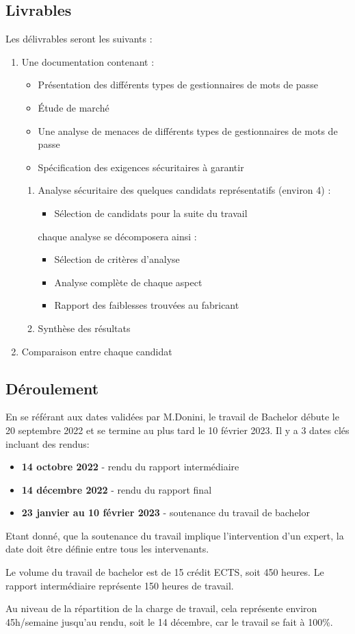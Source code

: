 \subsection*{Livrables}
Les délivrables seront les suivants :
\begin{enumerate}
\item Une documentation contenant :
	\begin{itemize}
	\item Présentation des différents types de gestionnaires de mots de passe
	\item Étude de marché
	\item Une analyse de menaces de différents types de gestionnaires de mots de passe
	\item Spécification des exigences sécuritaires à garantir
	\end{itemize}
	\begin{enumerate}
	\item Analyse sécuritaire des quelques candidats représentatifs (environ 4) :
		\begin{itemize}
		\item Sélection de candidats pour la suite du travail
		\end{itemize}
	chaque analyse se décomposera ainsi :
		\begin{itemize}
			\item Sélection de critères d'analyse
			\item Analyse complète de chaque aspect
			\item Rapport des faiblesses trouvées au fabricant
		\end{itemize}
	\item Synthèse des résultats
	\end{enumerate}
\item Comparaison entre chaque candidat
\end{enumerate}

\subsection*{Déroulement}
En se référant aux dates validées par M.Donini, le travail de Bachelor débute le 20 septembre 2022 et se termine au plus tard le 10 février 2023. Il y a 3 dates clés incluant des rendus:
\begin{itemize}
	\item \textbf{14 octobre 2022} - rendu du rapport intermédiaire
	\item \textbf{14 décembre 2022} - rendu du rapport final
	\item \textbf{23 janvier au 10 février 2023} - soutenance du travail de bachelor
\end{itemize}

Etant donné, que la soutenance du travail implique l'intervention d'un expert, la date doit être définie entre tous les intervenants.

Le volume du travail de bachelor est de 15 crédit ECTS, soit 450 heures. Le rapport intermédiaire représente 150 heures de travail. 

Au niveau de la répartition de la charge de travail, cela représente environ 45h/semaine jusqu'au rendu, soit le 14 décembre, car le travail se fait à 100\%. 

